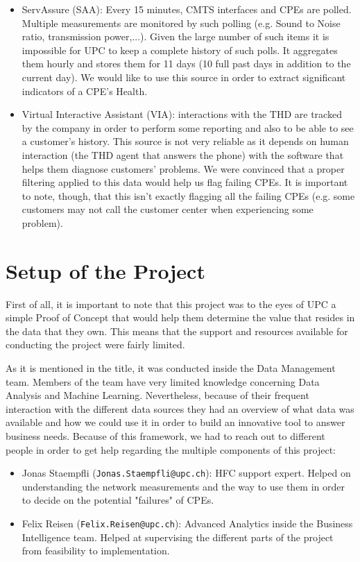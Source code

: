 \begin{itemize}
	\item ServAssure (SAA): Every 15 minutes, CMTS interfaces and CPEs are polled. Multiple measurements are monitored by such polling (e.g. Sound to Noise ratio, transmission power,...). Given the large number of such items it is impossible for UPC to keep a complete history of such polls. It aggregates them hourly and stores them for 11 days (10 full past days in addition to the current day). We would like to use this source in order to extract significant indicators of a CPE's Health.
	\item Virtual Interactive Assistant (VIA): interactions with the THD are tracked by the company in order to perform some reporting and also to be able to see a customer's history. This source is not very reliable as it depends on human interaction (the THD agent that answers the phone) with the software that helps them diagnose customers' problems. We were convinced that a proper filtering applied to this data would help us flag failing CPEs. It is important to note, though, that this isn't exactly flagging all the failing CPEs (e.g. some customers may not call the customer center when experiencing some problem).
\end{itemize}

\section{Setup of the Project}
\label{sec:setup}
First of all, it is important to note that this project was to the eyes of UPC a simple Proof of Concept that would help them determine the value that resides in the data that they own. This means that the support and resources available for conducting the project were fairly limited. 

As it is mentioned in the title, it was conducted inside the Data Management team. Members of the team have very limited knowledge concerning Data Analysis and Machine Learning. Nevertheless, because of their frequent interaction with the different data sources they had an overview of what data was available and how we could use it in order to build an innovative tool to answer business needs. Because of this framework, we had to reach out to different people in order to get help regarding the multiple components of this project:
\begin{itemize}
	\item Jonas Staempfli (\texttt{Jonas.Staempfli@upc.ch}): HFC support expert. Helped on understanding the network measurements and the way to use them in order to decide on the potential "failures" of CPEs.
	\item Felix Reisen (\texttt{Felix.Reisen@upc.ch}): Advanced Analytics inside the Business Intelligence team. Helped at supervising the different parts of the project from feasibility to implementation.
\end{itemize}

